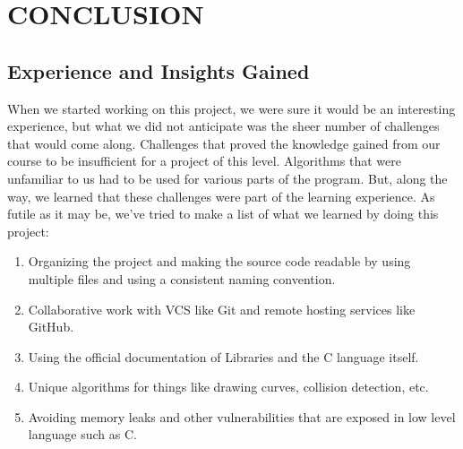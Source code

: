 \documentclass[report]{subfiles}
\begin{document}
    \chapter{CONCLUSION}
    \section{Experience and Insights Gained}
	When we started working on this project, we were sure it would be an interesting experience, but what we did not anticipate was the sheer number of challenges that would come along. Challenges that proved the knowledge gained from our course to be insufficient for a project of this level. Algorithms that were unfamiliar to us had to be used for various parts of the program. But, along the way, we learned that these challenges were part of the learning experience.
As futile as it may be, we've tried to make a list of what we learned by doing this project:
    \begin{enumerate}
        \item{Organizing the project and making the source code readable by using multiple files and using a consistent naming convention.}
        \item{Collaborative work with VCS like Git and remote hosting services like GitHub.}
        \item{Using the official documentation of Libraries and the C language itself.}
        \item{Unique algorithms for things like drawing curves, collision detection, etc.}
        \item{Avoiding memory leaks and other vulnerabilities that are exposed in low level language such as C.}
    \end{enumerate}
\end{document}
